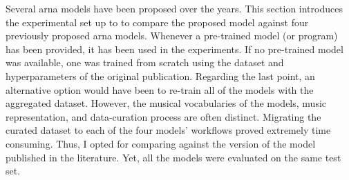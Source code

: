 
Several \gls{arna} models have been proposed over the years.
This section introduces the experimental set up to to
compare the proposed model against four previously proposed
\gls{arna} models. Whenever a pre-trained model (or program)
has been provided, it has been used in the experiments. If
no pre-trained model was available, one was trained from
scratch using the dataset and hyperparameters of the
original publication. Regarding the last point, an
alternative option would have been to re-train all of the
models with the aggregated dataset. However, the musical
vocabularies of the models, music representation, and
data-curation process are often distinct. Migrating the
curated dataset to each of the four models' workflows proved
extremely time consuming. Thus, I opted for comparing
against the version of the model published in the
literature. Yet, all the models were evaluated on the same
test set.
